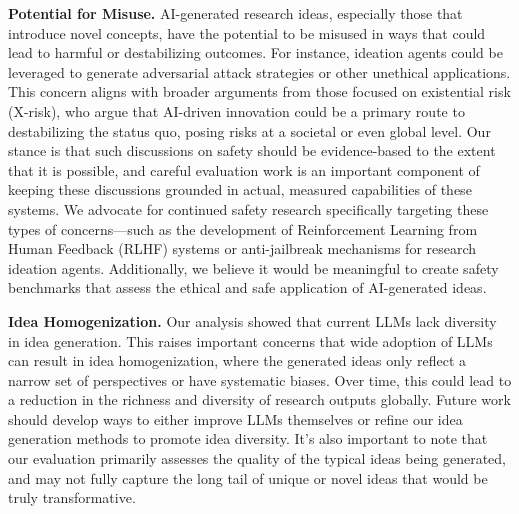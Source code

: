 \textbf{Potential for Misuse.}
AI-generated research ideas, especially those that introduce novel concepts, have the potential to be misused in ways that could lead to harmful or destabilizing outcomes. For instance, ideation agents could be leveraged to generate adversarial attack strategies or other unethical applications. This concern aligns with broader arguments from those focused on existential risk (X-risk), who argue that AI-driven innovation could be a primary route to destabilizing the status quo, posing risks at a societal or even global level.
%
Our stance is that such discussions on safety should be evidence-based to the extent that it is possible, and careful evaluation work is an important component of keeping these discussions grounded in actual, measured capabilities of these systems. We advocate for continued safety research specifically targeting these types of concerns—such as the development of Reinforcement Learning from Human Feedback (RLHF) systems or anti-jailbreak mechanisms for research ideation agents. Additionally, we believe it would be meaningful to create safety benchmarks that assess the ethical and safe application of AI-generated ideas.


\textbf{Idea Homogenization.}
Our analysis showed that current LLMs lack diversity in idea generation. 
This raises important concerns that wide adoption of LLMs 
 can result in idea homogenization, where the generated ideas only reflect a narrow set of perspectives or have systematic biases. 
 Over time, this could lead to a reduction in the richness and diversity of research outputs globally.
 Future work should develop ways to either improve LLMs themselves or refine our idea generation methods to promote idea diversity. 
 It's also important to note that our evaluation primarily assesses the quality of the typical ideas being generated, and may not fully capture the long tail of unique or novel ideas that would be truly transformative.


